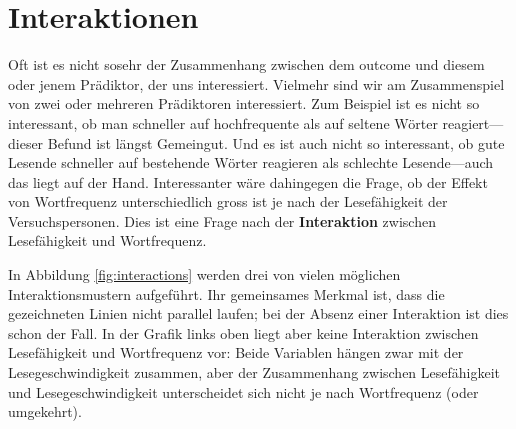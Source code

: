 \documentclass[oneside, 10pt]{book}\usepackage[]{graphicx}\usepackage[]{xcolor}
\begin{document}
\chapter{Interaktionen}
Oft ist es nicht sosehr der Zusammenhang
zwischen dem outcome und diesem oder jenem Prädiktor, der uns interessiert.
Vielmehr sind wir am Zusammenspiel von zwei oder mehreren Prädiktoren interessiert.
Zum Beispiel ist es nicht so interessant,
ob man schneller auf hochfrequente als auf seltene Wörter reagiert---dieser Befund ist längst Gemeingut.
Und es ist auch nicht so interessant,
ob gute Lesende schneller auf bestehende Wörter reagieren als schlechte Lesende---auch das liegt auf der Hand.
Interessanter wäre dahingegen die Frage, ob der Effekt von Wortfrequenz unterschiedlich gross ist je nach der Lesefähigkeit der Versuchspersonen.
Dies ist eine Frage nach der \textbf{Interaktion} zwischen Lesefähigkeit und Wortfrequenz.

In Abbildung \vref{fig:interactions} werden drei von vielen möglichen Interaktionsmustern aufgeführt.
Ihr gemeinsames Merkmal ist, dass die gezeichneten Linien nicht parallel laufen;
bei der Absenz einer Interaktion ist dies schon der Fall.
In der Grafik links oben liegt aber keine Interaktion zwischen Lesefähigkeit und Wortfrequenz vor:
Beide Variablen hängen zwar mit der Lesegeschwindigkeit zusammen,
aber der Zusammenhang zwischen Lesefähigkeit und Lesegeschwindigkeit unterscheidet sich nicht je nach
Wortfrequenz (oder umgekehrt).
\end{document}
